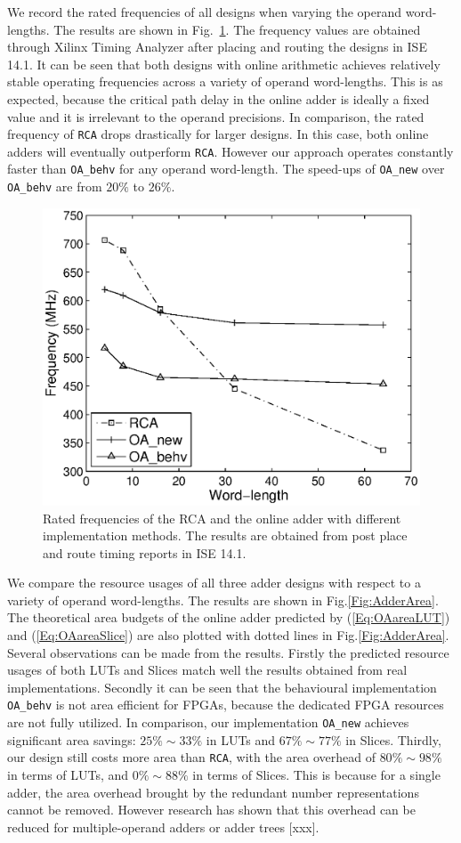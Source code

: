 \documentclass[conference]{IEEEtran}
\begin{document}
We record the rated frequencies of all designs when varying the operand word-lengths. The results are shown in Fig.~\ref{Fig:AdderFreq}. The frequency values are obtained through Xilinx Timing Analyzer after placing and routing the designs in ISE 14.1. It can be seen that both designs with online arithmetic achieves relatively stable operating frequencies across a variety of operand word-lengths. This is as expected, because the critical path delay in the online adder is ideally a fixed value and it is irrelevant to the operand precisions. In comparison, the rated frequency of \texttt{RCA} drops drastically for larger designs. In this case, both online adders will eventually outperform \texttt{RCA}. However our approach operates constantly faster than \texttt{OA\_behv} for any operand word-length. The speed-ups of \texttt{OA\_new} over \texttt{OA\_behv} are from $20\%$ to $26\%$.

\begin{figure}[tbp]
	\centering
	\includegraphics[width=.45\textwidth]{./Figures/Exp/Adder_Freq.eps}
	\caption{Rated frequencies of the RCA and the online adder with different implementation methods. The results are obtained from post place and route timing reports in ISE 14.1.}
	\label{Fig:AdderFreq}
\end{figure}


We compare the resource usages of all three adder designs with respect to a variety of operand word-lengths. The results are shown in Fig.\ref{Fig:AdderArea}. The theoretical area budgets of the online adder predicted by (\ref{Eq:OAareaLUT}) and (\ref{Eq:OAareaSlice}) are also plotted with dotted lines in Fig.\ref{Fig:AdderArea}. Several observations can be made from the results. Firstly the predicted resource usages of both LUTs and Slices match well the results obtained from real implementations. Secondly it can be seen that the behavioural implementation \texttt{OA\_behv} is not area efficient for FPGAs, because the dedicated FPGA resources are not fully utilized. In comparison, our implementation \texttt{OA\_new} achieves significant area savings: $25\%\sim 33\%$ in LUTs and $67\%\sim77\%$ in Slices. Thirdly, our design still costs more area than \texttt{RCA}, with the area overhead of $80\%\sim98\%$ in terms of LUTs, and $0\%\sim88\%$ in terms of Slices. This is because for a single adder, the area overhead brought by the redundant number representations cannot be removed. However research has shown that this overhead can be reduced for multiple-operand adders or adder trees [xxx].
\end{document}
